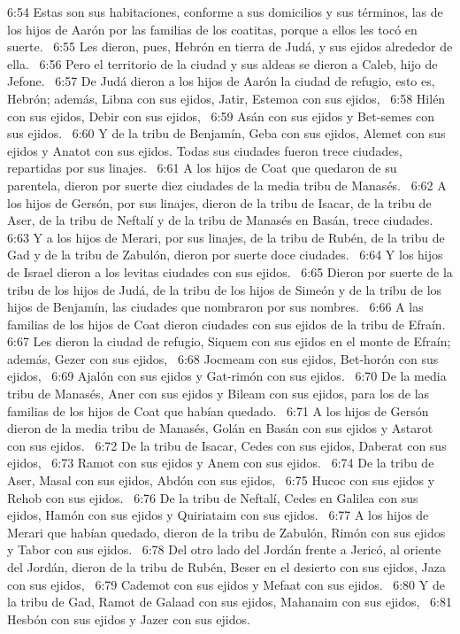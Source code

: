 6:54 Estas son sus habitaciones, conforme a sus domicilios y sus términos, las de los hijos de Aarón por las familias de los coatitas, porque a ellos les tocó en suerte.  
6:55 Les dieron, pues, Hebrón en tierra de Judá, y sus ejidos alrededor de ella.  
6:56 Pero el territorio de la ciudad y sus aldeas se dieron a Caleb, hijo de Jefone.  
6:57 De Judá dieron a los hijos de Aarón la ciudad de refugio, esto es, Hebrón; además, Libna con sus ejidos, Jatir, Estemoa con sus ejidos,  
6:58 Hilén con sus ejidos, Debir con sus ejidos,  
6:59 Asán con sus ejidos y Bet-semes con sus ejidos.  
6:60 Y de la tribu de Benjamín, Geba con sus ejidos, Alemet con sus ejidos y Anatot con sus ejidos. Todas sus ciudades fueron trece ciudades, repartidas por sus linajes.  
6:61 A los hijos de Coat que quedaron de su parentela, dieron por suerte diez ciudades de la media tribu de Manasés.  
6:62 A los hijos de Gersón, por sus linajes, dieron de la tribu de Isacar, de la tribu de Aser, de la tribu de Neftalí y de la tribu de Manasés en Basán, trece ciudades.  
6:63 Y a los hijos de Merari, por sus linajes, de la tribu de Rubén, de la tribu de Gad y de la tribu de Zabulón, dieron por suerte doce ciudades.  
6:64 Y los hijos de Israel dieron a los levitas ciudades con sus ejidos.  
6:65 Dieron por suerte de la tribu de los hijos de Judá, de la tribu de los hijos de Simeón y de la tribu de los hijos de Benjamín, las ciudades que nombraron por sus nombres.  
6:66 A las familias de los hijos de Coat dieron ciudades con sus ejidos de la tribu de Efraín.  
6:67 Les dieron la ciudad de refugio, Siquem con sus ejidos en el monte de Efraín; además, Gezer con sus ejidos,  
6:68 Jocmeam con sus ejidos, Bet-horón con sus ejidos,  
6:69 Ajalón con sus ejidos y Gat-rimón con sus ejidos.  
6:70 De la media tribu de Manasés, Aner con sus ejidos y Bileam con sus ejidos, para los de las familias de los hijos de Coat que habían quedado.  
6:71 A los hijos de Gersón dieron de la media tribu de Manasés, Golán en Basán con sus ejidos y Astarot con sus ejidos.  
6:72 De la tribu de Isacar, Cedes con sus ejidos, Daberat con sus ejidos,  
6:73 Ramot con sus ejidos y Anem con sus ejidos.  
6:74 De la tribu de Aser, Masal con sus ejidos, Abdón con sus ejidos,  
6:75 Hucoc con sus ejidos y Rehob con sus ejidos.  
6:76 De la tribu de Neftalí, Cedes en Galilea con sus ejidos, Hamón con sus ejidos y Quiriataim con sus ejidos.  
6:77 A los hijos de Merari que habían quedado, dieron de la tribu de Zabulón, Rimón con sus ejidos y Tabor con sus ejidos.  
6:78 Del otro lado del Jordán frente a Jericó, al oriente del Jordán, dieron de la tribu de Rubén, Beser en el desierto con sus ejidos, Jaza con sus ejidos,  
6:79 Cademot con sus ejidos y Mefaat con sus ejidos.  
6:80 Y de la tribu de Gad, Ramot de Galaad con sus ejidos, Mahanaim con sus ejidos,  
6:81 Hesbón con sus ejidos y Jazer con sus ejidos.  
